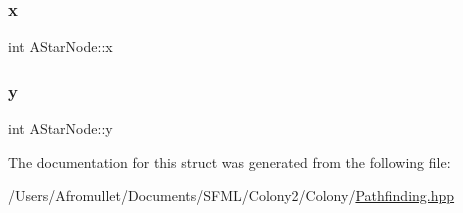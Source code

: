 \mbox{\label{struct_a_star_node_a7d4d80244c6ddf6733b70c87dca1a67e}} 
\subsubsection{\texorpdfstring{x}{x}}
{\footnotesize\ttfamily int A\+Star\+Node\+::x}

\mbox{\label{struct_a_star_node_a9d583c923d4a73876a348299ec54f8c0}} 
\subsubsection{\texorpdfstring{y}{y}}
{\footnotesize\ttfamily int A\+Star\+Node\+::y}



The documentation for this struct was generated from the following file\+:\begin{DoxyCompactItemize}
\item 
/\+Users/\+Afromullet/\+Documents/\+S\+F\+M\+L/\+Colony2/\+Colony/\mbox{\hyperlink{_pathfinding_8hpp}{Pathfinding.\+hpp}}\end{DoxyCompactItemize}
